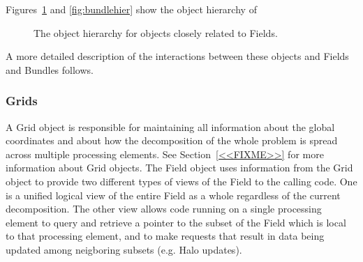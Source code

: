 
Figures~\ref{fig:fieldhier} and \ref{fig:bundlehier} show the object hierarchy of

\begin{figure}
\caption[Field hierarchy]{The object hierarchy for objects closely related to Fields.}
\label{fig:fieldhier}
\end{figure}


A more detailed description of the interactions between
these objects and Fields and Bundles follows.

\subsubsection{Grids}

A Grid object is responsible for
maintaining all information about the global coordinates and about how
the decomposition of the whole problem is spread across multiple
processing elements.  
See Section~\ref{<<FIXME>>} for more information about Grid objects.  
The Field object uses information from the Grid object to provide
two different types of views of the Field to the calling code.
One is a unified logical view of the entire Field as a whole
regardless of the current decomposition.  The other view allows code
running on a single processing element to query and retrieve a pointer 
to the subset of the Field which is local to that processing element,
and to make requests that result in data being updated among neigboring
subsets (e.g. Halo updates).

